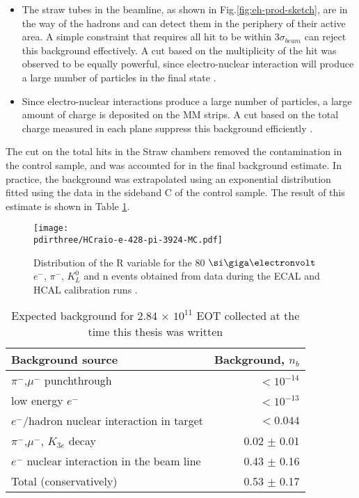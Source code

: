 \begin{itemize}
\item The straw tubes in the beamline, as shown in Fig.\ref{fig:eh-prod-sketch}, are in the way of the hadrons and can detect them in the periphery of their active area. A simple constraint that requires all hit to be within 3$\sigma_{beam}$ can reject this background effectively. A cut based on the multiplicity of the hit was observed to be equally powerful, since electro-nuclear interaction will produce a large number of particles in the final state \cite{pdegen-thesis}.
\item Since electro-nuclear interactions produce a large number of particles, a large amount of charge is deposited on the MM strips. A cut based on the total charge measured in each plane suppress this background efficiently \cite{na64-invisible-cuts}.
\end{itemize}

The cut on the total hits in the Straw chambers removed the contamination in the control sample, and was accounted for in the final background estimate. In practice, the background was extrapolated using an exponential distribution fitted using the data in the sideband C of the control sample. The result of this estimate is shown in Table \ref{tab:inv-bkg}.

\begin{figure}[bht!]
  \centering
  \texttt{[image: \\pdirthree/HCraio-e-428-pi-3924-MC.pdf]}
  \caption[R value comparison]{Distribution of the R variable for the 80 $\gev$ $e^-$, $\pi^-$, $K_L^0$ and n events obtained from data during the ECAL and HCAL calibration runs \cite{Banerjee:2020fue}.}
  \label{fig:R-comp}
\end{figure}

\begin{table}[bth!]
  \centering
  \caption[Invisible mode background]{Expected background for 2.84 $\times$ $10^{11}$ EOT collected at the time this thesis was written \cite{NA64:2019imj}}
  \begin{tabular}{lr}
    \hline \hline
    Background source & Background, $n_b$ \\
    \hline
    $\pi^-$,$\mu^-$ punchthrough                      & $<10^{-14}$ \\
    low energy $e^-$                                  & $<10^{-13}$ \\
    $e^-$/hadron nuclear interaction in target        & $<0.044$   \\
    $\pi^-$,$\mu^-$, $K_{3e}$ decay                    & 0.02 $\pm$ 0.01 \\
    $e^-$ nuclear interaction in the  beam line       & 0.43 $\pm$ 0.16 \\
    \hline
    Total (conservatively)                            & 0.53 $\pm$ 0.17 \\
    \hline \hline                       
  \end{tabular}
  \label{tab:inv-bkg}
\end{table}



